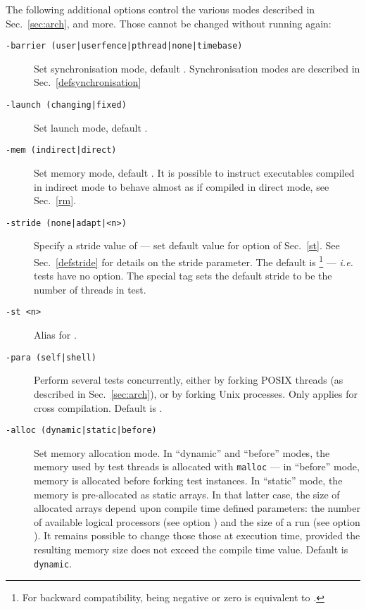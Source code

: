 The following additional options control the various modes described
in Sec.~\ref{sec:arch}, and more.
Those cannot be changed without running \litmus{} again:
\begin{description}
\item[{\tt -barrier (user|userfence|pthread|none|timebase)}] Set synchronisation mode, default . Synchronisation modes are described
in Sec.~\ref{defsynchronisation}
\item[{\tt -launch (changing|fixed)}] Set launch mode,
default .
\item[{\tt -mem (indirect|direct)}] Set memory mode,
default .
It is possible to instruct executables compiled in indirect mode
to behave almost as if compiled in direct mode, see Sec.~\ref{rm}.
\item[{\tt -stride (none|adapt|<n>)}]
Specify a stride value of  --- set default value for option  of Sec.~\ref{st}. See Sec.~\ref{defstride} for details on the stride parameter.
The default is \footnote{For backward compatibility,  being negative or zero is equivalent to .}
--- \emph{i.e.} tests have no
 option. The special tag  sets the default
stride to be the number of threads in test.

\item[{\tt -st <n>}] Alias for .
\item[{\tt -para (self|shell)}]
Perform several tests concurrently, either by forking POSIX
threads (as described in Sec.~\ref{sec:arch}), or by forking
Unix processes. Only applies for cross compilation.
Default is .
\item[{\tt -alloc (dynamic|static|before)}]
Set memory allocation mode. In ``dynamic'' and ``before'' modes, the memory
used by test threads is allocated with \texttt{malloc} --- in ``before'' mode,
memory is allocated before forking test instances.
In ``static'' mode, the memory is pre-allocated as static arrays.
In that latter case, the size of allocated arrays depend upon
compile time defined parameters: the number of available logical processors
(see option )
and the size of a run (see option ).
It remains possible to change those those at execution time, provided
the resulting memory size does not exceed the compile time value.
Default is \texttt{dynamic}.


\end{description}

